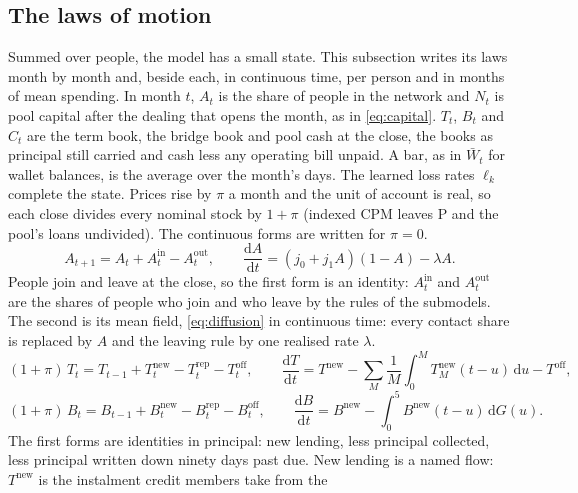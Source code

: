 \subsection{The laws of motion}\label{sec:laws}

Summed over people, the model has a small state. This subsection writes its laws month by month and, beside each, in
continuous time, per person and in months of mean spending. In month $t$, $A_{t}$ is the share of people in the
network and $N_{t}$ is pool capital after the dealing that opens the month, as in \eqref{eq:capital}. $T_{t}$,
$B_{t}$ and $C_{t}$ are the term book, the bridge book and pool cash at the close, the books as principal still
carried and cash less any operating bill unpaid. A bar, as in $\bar W_{t}$ for wallet balances, is the average over
the month's days. The learned loss rates $\ell_{k}$ complete the state. Prices rise by $\pi$ a month and the unit of
account is real, so each close divides every nominal stock by $1+\pi$ (indexed CPM leaves P and the pool's loans
undivided). The continuous forms are written for $\pi = 0$.
\begin{equation}
A_{t+1} = A_{t} + A^{\mathrm{in}}_{t} - A^{\mathrm{out}}_{t},
\qquad
\frac{\mathrm{d}A}{\mathrm{d}t} = (j_{0} + j_{1}A)(1 - A) - \lambda A .
\label{eq:law-A}
\end{equation}
People join and leave at the close, so the first form is an identity: $A^{\mathrm{in}}_{t}$ and
$A^{\mathrm{out}}_{t}$ are the shares of people who join and who leave by the rules of the submodels. The second is
its mean field, \eqref{eq:diffusion} in continuous time: every contact share is replaced by $A$ and the leaving rule
by one realised rate $\lambda$.
\begin{equation}
(1+\pi)\,T_{t} = T_{t-1} + T^{\mathrm{new}}_{t} - T^{\mathrm{rep}}_{t} - T^{\mathrm{off}}_{t},
\qquad
\frac{\mathrm{d}T}{\mathrm{d}t} = T^{\mathrm{new}} - \sum_{M}\frac{1}{M}\int_{0}^{M} T^{\mathrm{new}}_{M}(t-u)\,\mathrm{d}u - T^{\mathrm{off}} ,
\label{eq:law-T}
\end{equation}
\begin{equation}
(1+\pi)\,B_{t} = B_{t-1} + B^{\mathrm{new}}_{t} - B^{\mathrm{rep}}_{t} - B^{\mathrm{off}}_{t},
\qquad
\frac{\mathrm{d}B}{\mathrm{d}t} = B^{\mathrm{new}} - \int_{0}^{5} B^{\mathrm{new}}(t-u)\,\mathrm{d}G(u) .
\label{eq:law-B}
\end{equation}
The first forms are identities in principal: new lending, less principal collected, less principal written down
ninety days past due. New lending is a named flow: $T^{\mathrm{new}}$ is the instalment credit members take from the
